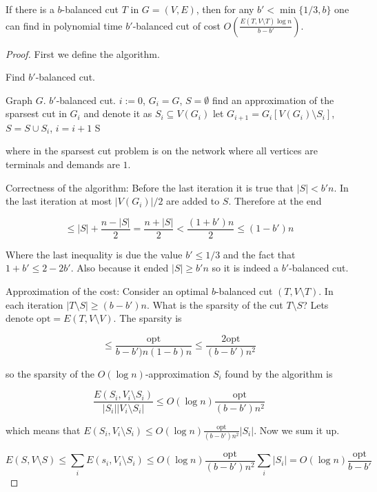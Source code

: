 \begin{thm}
	If there is a $b$-balanced cut $T$ in $G = (V,E)$, then for any $b' < \min\{1/3, b\}$ one can find in polynomial time $b'$-balanced cut of cost $O \left(\frac{E(T, V \setminus T) \log n}{b-b'}\right)$.
\end{thm}

\begin{proof}
	First we define the algorithm.
	
	\begin{algorithm}
		\caption{Find $b'$-balanced cut.}
		\begin{algorithmic}[1]
			\Require Graph $G$.
			\Ensure $b'$-balanced cut.
			\State $i := 0$, $G_{i} = G$, $S = \emptyset$
			\State find an approximation of the sparsest cut in $G_{i}$ and denote it as $S_{i} \subseteq V(G_{i})$
			\State let $G_{i+1} = G_{i}[V(G_{i}) \setminus S_{i}]$, $S = S \cup S_{i}$, $i = i+1$
			\EndWhile
			\Return S
		\end{algorithmic}
	\end{algorithm}
	
	where in the sparsest cut problem is on the network where all vertices are terminals and demands are $1$.
	
	Correctness of the algorithm: Before the last iteration it is true that $|S| < b'n$. In the last iteration at most $|V(G_{i})| / 2$ are added to $S$. Therefore at the end
	
	$$
	\leq |S| + \frac{n - |S|}{2} = \frac{n + |S|}{2} < \frac{(1+ b')n}{2} \leq (1- b')n
	$$
	
	Where the last inequality is due the value $b' \leq 1/3$ and the fact that $1+b' \leq 2-2b'$. Also because it ended $|S| \geq b'n$ so it is indeed a $b'$-balanced cut.
	
	Approximation of the cost:	Consider an optimal $b$-balanced cut $(T, V \setminus T)$. In each iteration $|T \setminus S| \geq (b - b') n$. What is the sparsity of the cut $T \setminus S$? Lets denote $\text{opt} = E(T, V \setminus V)$. The sparsity is
	
	$$
	\leq \frac{\text{opt}}{b - b')n(1-b)n} \leq \frac{2 \text{opt}}{(b-b')n^{2}}
	$$
	
	so the sparsity of the $O(\log n)$-approximation $S_{i}$ found by the algorithm is
	
	$$
	\frac{E(S_{i}, V_{i} \setminus S_{i})}{|S_{i}| |V_{i} \setminus S_{i}|} \leq O(\log n) \frac{\text{opt}}{(b-b')n^{2}}
	$$
	
	which means that $E(S_{i}, V_{i} \setminus S_{i}) \leq O(\log n) \frac{\text{opt}}{(b-b')n^{2}} |S_{i}|$. Now we sum it up.
	
	$$
	E(S, V \setminus S) \leq \sum_{i} E(s_{i}, V_{i} \setminus S_{i}) \leq O(\log n) \frac{\text{opt}}{(b-b')n^{2}} \sum_{i} |S_{i}| = O(\log n) \frac{\text{opt}}{b - b'}
	$$
\end{proof}

